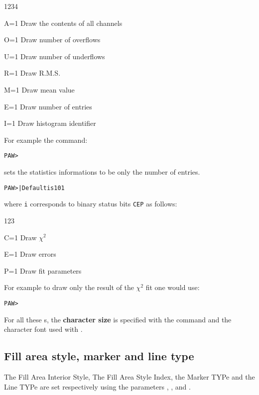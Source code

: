 \begin{DLtt}{1234}
\item[A=1] Draw the contents of all channels
\item[O=1] Draw number of overflows
\item[U=1] Draw number of underflows
\item[R=1] Draw R.M.S.
\item[M=1] Draw mean value
\item[E=1] Draw number of entries
\item[I=1] Draw histogram identifier
\end{DLtt}

For example the command:

\begin{alltt}
PAW > 
\end{alltt}

sets the statistics informations to be only the number of entries.

\begin{alltt}
PAW >      | Default is 101
\end{alltt}
where \texttt{i} corresponds to binary status bits \texttt{CEP} as follows: 

\begin{DLtt}{123}
\item[C=1] Draw \(\chi^2\)
\item[E=1] Draw errors
\item[P=1] Draw fit parameters
\end{DLtt}

For example to draw only the result of the \(\chi^2\) fit one would use:
\begin{alltt}
PAW > 
\end{alltt}

For all these s, the {\bf character size} is specified with the 
command  and the character font used with 
.



\subsection*{Fill area style, marker and line type}

The Fill Area Interior Style, The Fill Area Style Index,
the Marker TYPe and the Line TYPe are set respectively using the
 parameters
, ,  and .

